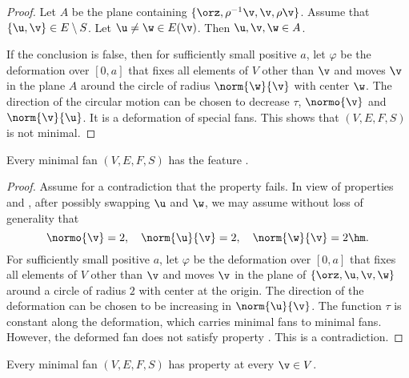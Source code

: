 \begin{proof} 
Let $A$ be the plane containing $\{\orz,\rho^{-1}\v,\v,\rho\v\}$.
Assume that $\{\u,\v\}\in E\setminus S$.  Let $\u\ne \w\in E(\v)$.
Then $\u,\v,\w\in A$.

If the conclusion is false, then for sufficiently small positive
$a$, let $\varphi$ be the deformation over $[0,a]$ that fixes all
elements of $V$ other than $\v$ and moves $\v$ in the plane $A$
around the circle of radius $\norm{\w}{\v}$ with center $\w$.  The
direction of the circular motion can be chosen to decrease $\tau$, $\normo{\v}$
and $\norm{\v}{\u}$.
It is a deformation of special fans.  This shows that $(V,E,F,S)$ is
not minimal.
\end{proof}

\begin{lemma}[balance]\label{l:b}
Every minimal fan $(V,E,F,S)$ has the feature .
\end{lemma}

\begin{proof} Assume for a contradiction that the property fails.  In
view of properties  and ,
after possibly swapping $\u$ and $\w$, we may assume without loss of
generality that
\[ 
\normo{\v}=2,\quad \norm{\u}{\v}=2,\quad \norm{\w}{\v}=2\hm.
\] 
For sufficiently small positive $a$, let $\varphi$ be the deformation
over $[0,a]$ that fixes all elements of $V$ other than $\v$ and moves
$\v$ in the plane of $\{\orz,\u,\v,\w\}$ around a circle of radius $2$
with center at the origin.  The direction of the deformation can be
chosen to be increasing in $\norm{\u}{\v}$.  The function $\tau$ is
constant along the deformation, which carries minimal fans
to minimal fans.  However, the deformed fan does not satisfy property
.  This is a contradiction.
\end{proof}




\begin{lemma}\label{l:fm}
Every minimal fan $(V,E,F,S)$ has property
 at every $\v\in V$.
\end{lemma}

